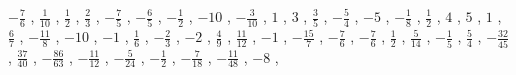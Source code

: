 \documentclass[12pt,fleqn]{article}
\theoremstyle{aufg}
\theoremstyle{bsp}
\begin{document}
\begin{flushleft}
$ \scriptstyle- \frac{7}{6}$ , $ \scriptstyle\frac{1}{10}$ , $ \scriptstyle\frac{1}{2}$ , $ \scriptstyle\frac{2}{3}$ , $ \scriptstyle- \frac{7}{5}$ , $ \scriptstyle- \frac{6}{5}$ , $ \scriptstyle- \frac{1}{2}$ , $ \scriptstyle-10$ , $ \scriptstyle- \frac{3}{10}$ , $ \scriptstyle1$ , $ \scriptstyle3$ , $ \scriptstyle\frac{3}{5}$ , $ \scriptstyle- \frac{5}{4}$ , $ \scriptstyle-5$ , $ \scriptstyle- \frac{1}{8}$ , $ \scriptstyle\frac{1}{2}$ , $ \scriptstyle4$ , $ \scriptstyle5$ , $ \scriptstyle1$ , $ \scriptstyle\frac{6}{7}$ , $ \scriptstyle- \frac{11}{8}$ , $ \scriptstyle-10$ , $ \scriptstyle-1$ , $ \scriptstyle\frac{1}{6}$ , $ \scriptstyle- \frac{2}{3}$ , $ \scriptstyle-2$ , $ \scriptstyle\frac{4}{9}$ , $ \scriptstyle\frac{11}{12}$ , $ \scriptstyle-1$ , $ \scriptstyle- \frac{15}{7}$ , $ \scriptstyle- \frac{7}{6}$ , $ \scriptstyle- \frac{7}{6}$ , $ \scriptstyle\frac{1}{2}$ , $ \scriptstyle\frac{5}{14}$ , $ \scriptstyle- \frac{1}{5}$ , $ \scriptstyle\frac{5}{4}$ , $ \scriptstyle- \frac{32}{45}$ , $ \scriptstyle\frac{37}{40}$ , $ \scriptstyle- \frac{86}{63}$ , $ \scriptstyle- \frac{11}{12}$ , $ \scriptstyle- \frac{5}{24}$ , $ \scriptstyle- \frac{1}{2}$ , $ \scriptstyle- \frac{7}{18}$ , $ \scriptstyle- \frac{11}{48}$ , $ \scriptstyle-8$ , \end{flushleft} 
\end{document}
